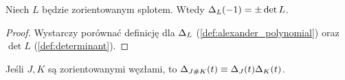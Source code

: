 \begin{proposition}
    \label{prp:alexander_determinant}
    Niech $L$ będzie zorientowanym splotem.
    Wtedy $\Delta_L(-1) = \pm \det L$.
\end{proposition}

\begin{proof}
    Wystarczy porównać definicję dla $\Delta_L$ (\ref{def:alexander_polynomial}) oraz $\det L$ (\ref{def:determinant}).
\end{proof}

\begin{proposition}
    \label{prp:alexander_multiplicative}
    Jeśli $J, K$ są zorientowanymi węzłami, to $\Delta_{J \mathbin{\#} K}(t) \equiv \Delta_J(t) \Delta_K(t)$.
\end{proposition}

